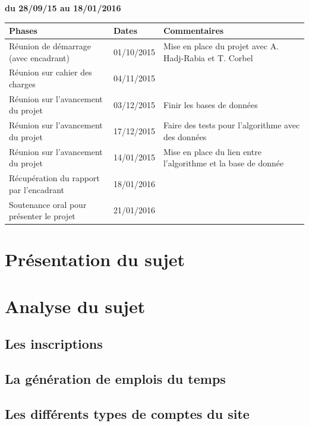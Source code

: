 \documentclass[12pt,a4paper]{article}
\begin{document}
\begin{center}\begin{large}
\textbf{du 28/09/15 au 18/01/2016}
\end{large}\end{center}

\newpage

\begin{tabular}{|L{5cm}|C{3cm}|L{5cm}|}
\hline \textbf{Phases} & \textbf{Dates} & \textbf{Commentaires} \\
\hline Réunion de démarrage (avec encadrant) & 01/10/2015 & Mise en place du projet avec A. Hadj-Rabia et T. Corbel \\
\hline Réunion sur cahier des charges & 04/11/2015 &  \\
\hline Réunion sur l’avancement du projet & 03/12/2015 & Finir les bases de données \\
\hline Réunion sur l’avancement du projet & 17/12/2015 & Faire des tests pour l’algorithme  avec des données \\
\hline Réunion sur l’avancement du projet & 14/01/2015 & Mise en place du lien entre l’algorithme et la base de donnée \\
\hline Récupération du rapport par l'encadrant & 18/01/2016 & \\
\hline Soutenance oral pour présenter le projet & 21/01/2016 & \\
\hline
\end{tabular}


\newpage
\newpage
\renewcommand{\contentsname}{Sommaire}
\tableofcontents
\newpage
\section{Présentation du sujet}
\newpage
\section{Analyse du sujet}
\subsection{Les inscriptions}
\subsection{La génération de emplois du temps}
\subsection{Les différents types de comptes du site}
\newpage
\end{document}
